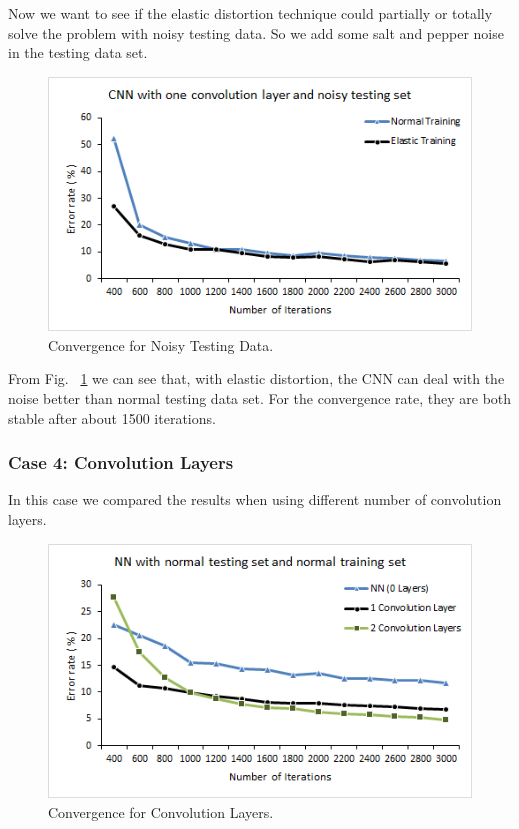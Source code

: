 Now we want to see if the elastic distortion technique could partially or totally solve the problem with noisy testing data. So we add some salt and pepper noise in the testing data set.

\begin {figure}[t]
\centering
\includegraphics[width=0.9\columnwidth]{Paper_Fig9_Conv_Case3.png} %
\caption{Convergence for Noisy Testing Data.}
\label{Convergence plot in case 3}
\end {figure}


From Fig. ~\ref{Convergence plot in case 3} we can see that, with elastic distortion, the CNN can deal with the noise better than
normal testing data set. For the convergence rate, they are both stable after about 1500 iterations.

\subsubsection*{Case 4: Convolution Layers}

In this case we compared the results when using different number of convolution layers.

\begin {figure}[t]
\centering
\includegraphics[width=0.9\columnwidth]{Paper_Fig10_Conv_Case4.png} %
\caption{Convergence for Convolution Layers.}
\label{Convergence plot in case 4}
\vspace{-10pt}
\end {figure}


